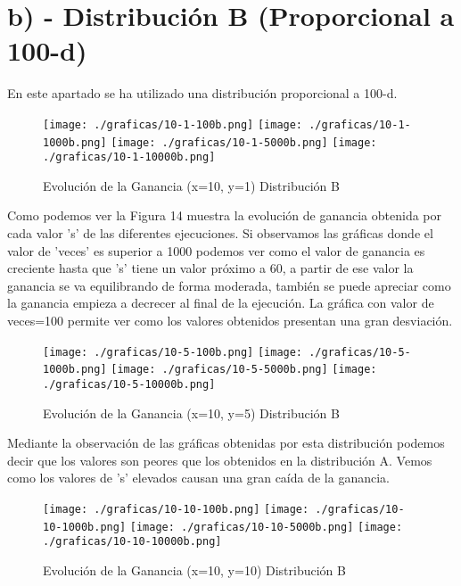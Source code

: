 \documentclass{article}
\begin{document}
	\section*{b) - Distribución B (Proporcional a 100-d)}	
	
		\normalsize En este apartado se ha utilizado una distribución proporcional a 100-d. \\
		
		\begin{figure}[htb]
			\centering
			\texttt{[image: ./graficas/10-1-100b.png]}
			\texttt{[image: ./graficas/10-1-1000b.png]}
			\texttt{[image: ./graficas/10-1-5000b.png]}
			\texttt{[image: ./graficas/10-1-10000b.png]}
			\caption{Evolución de la Ganancia (x=10, y=1) Distribución B}
		\end{figure} 

	\newpage

	Como podemos ver la Figura 14 muestra la evolución de ganancia obtenida por cada valor 's' de las diferentes ejecuciones. Si observamos las gráficas donde el valor de 'veces' es superior a 1000 podemos ver como el valor de ganancia es creciente hasta que 's' tiene un valor próximo a 60, a partir de ese valor la ganancia se va equilibrando de forma moderada, también se puede apreciar como la ganancia empieza a decrecer al final de la ejecución. La gráfica con valor de veces=100 permite  ver como los valores obtenidos presentan una gran desviación. \\
	
	\begin{figure}[htb]
		\centering
		\texttt{[image: ./graficas/10-5-100b.png]}
		\texttt{[image: ./graficas/10-5-1000b.png]}
		\texttt{[image: ./graficas/10-5-5000b.png]}
		\texttt{[image: ./graficas/10-5-10000b.png]}
		\caption{Evolución de la Ganancia (x=10, y=5) Distribución B}
	\end{figure} 

	Mediante la observación de las gráficas obtenidas por esta distribución podemos decir que los valores son peores que los obtenidos en la distribución A. Vemos como los valores de 's' elevados causan una gran caída de la ganancia.
	
	
	\begin{figure}[h]
		\centering
		\texttt{[image: ./graficas/10-10-100b.png]}
		\texttt{[image: ./graficas/10-10-1000b.png]}
		\texttt{[image: ./graficas/10-10-5000b.png]}
		\texttt{[image: ./graficas/10-10-10000b.png]}
		\caption{Evolución de la Ganancia (x=10, y=10) Distribución B}
	\end{figure}
\end{document}
